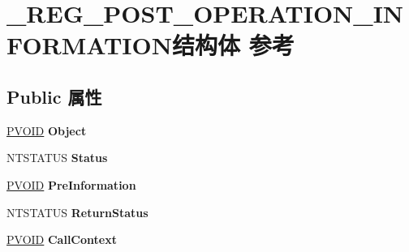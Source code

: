\hypertarget{struct___r_e_g___p_o_s_t___o_p_e_r_a_t_i_o_n___i_n_f_o_r_m_a_t_i_o_n}{}\section{\+\_\+\+R\+E\+G\+\_\+\+P\+O\+S\+T\+\_\+\+O\+P\+E\+R\+A\+T\+I\+O\+N\+\_\+\+I\+N\+F\+O\+R\+M\+A\+T\+I\+O\+N结构体 参考}
\label{struct___r_e_g___p_o_s_t___o_p_e_r_a_t_i_o_n___i_n_f_o_r_m_a_t_i_o_n}
\subsection*{Public 属性}
\begin{DoxyCompactItemize}
\item 
\mbox{\label{struct___r_e_g___p_o_s_t___o_p_e_r_a_t_i_o_n___i_n_f_o_r_m_a_t_i_o_n_a5fc446794eb12ae300bf8f9383721fd0}} 
\hyperlink{interfacevoid}{P\+V\+O\+ID} {\bfseries Object}
\item 
\mbox{\label{struct___r_e_g___p_o_s_t___o_p_e_r_a_t_i_o_n___i_n_f_o_r_m_a_t_i_o_n_a72cd7b9f7e1d5188707e13924cf0db68}} 
N\+T\+S\+T\+A\+T\+US {\bfseries Status}
\item 
\mbox{\label{struct___r_e_g___p_o_s_t___o_p_e_r_a_t_i_o_n___i_n_f_o_r_m_a_t_i_o_n_a780057b0088e45569b0016d316fc7ab9}} 
\hyperlink{interfacevoid}{P\+V\+O\+ID} {\bfseries Pre\+Information}
\item 
\mbox{\label{struct___r_e_g___p_o_s_t___o_p_e_r_a_t_i_o_n___i_n_f_o_r_m_a_t_i_o_n_a1c04fe5f3f240c17599773bc84a019ad}} 
N\+T\+S\+T\+A\+T\+US {\bfseries Return\+Status}
\item 
\mbox{\label{struct___r_e_g___p_o_s_t___o_p_e_r_a_t_i_o_n___i_n_f_o_r_m_a_t_i_o_n_aee786942d58a125b4ff493b6e53edb2a}} 
\hyperlink{interfacevoid}{P\+V\+O\+ID} {\bfseries Call\+Context}

\end{DoxyCompactItemize}
